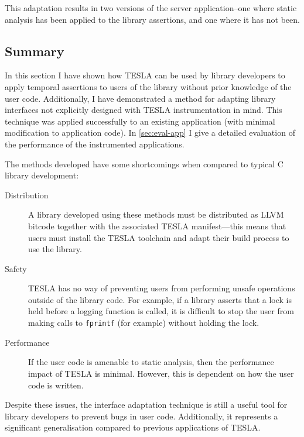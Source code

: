 This adaptation results in two versions of the server application--one where
static analysis has been applied to the library assertions, and one where it has
not been.

\subsection{Summary}

In this section I have shown how TESLA can be used by library developers to
apply temporal assertions to users of the library without prior knowledge of the
user code. Additionally, I have demonstrated a method for adapting library
interfaces not explicitly designed with TESLA instrumentation in mind. This
technique was applied successfully to an existing application (with minimal
modification to application code). In \autoref{sec:eval-app} I give a detailed
evaluation of the performance of the instrumented applications.

The methods developed have some shortcomings when compared to typical C library
development:
\begin{description}
  \item[Distribution] A library developed using these methods must be
    distributed as LLVM bitcode together with the associated TESLA
    manifest---this means that users must install the TESLA toolchain and adapt
    their build process to use the library.

  \item[Safety] TESLA has no way of preventing users from performing unsafe
    operations outside of the library code. For example, if a library asserts
    that a lock is held before a logging function is called, it is difficult to
    stop the user from making calls to \texttt{fprintf} (for example)
    without holding the lock.

  \item[Performance] If the user code is amenable to static analysis, then the
    performance impact of TESLA is minimal. However, this is dependent on how
    the user code is written.
\end{description}

Despite these issues, the interface adaptation technique is still a useful tool
for library developers to prevent bugs in user code. Additionally, it represents
a significant generalisation compared to previous applications of TESLA.
